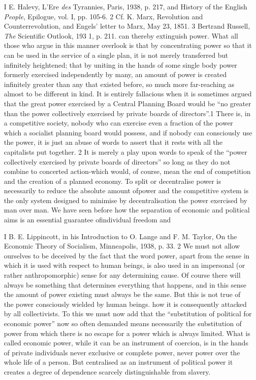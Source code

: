 \documentclass[11pt,openany]{book}
\begin{document}
I E. Halevy, L'Ere \emph{des} Tyrannies, Paris, 1938, p. 217, and History of the English \emph{People}, Epilogue, vol. I, pp. 105-6. 2 Cf. K. Marx, Revolution and Counterrevolution, and Engels' letter to Marx, May 23, 1851. 3 Bertrand Russell, \emph{The} Scientific Outlook, 193 1, p. 211. can thereby extinguish power. What all those who argue in this manner overlook is that by concentrating power so that it can be used in the service of a single plan, it is not merely transferred but infinitely heightened; that by uniting in the hands of some single body power formerly exercised independently by many, an amount of power is created infinitely greater than any that existed before, so much more far-reaching as almost to be different in kind. It is entirely fallacious when it is sometimes argued that the great power exercised by a Central Planning Board would be ``no greater than the power collectively exercised by private boards of directors''.1 There is, in a competitive society, nobody who can exercise even a fraction of the power which a socialist planning board would possess, and if nobody can consciously use the power, it is just an abuse of words to assert that it rests with all the capitalists put together. 2 It is merely a play upon words to speak of the ``power collectively exercised by private boards of directors'' so long as they do not combine to concerted action-which would, of course, mean the end of competition and the creation of a planned economy. To split or decentralise power is necessarily to reduce the absolute amount ofpower and the competitive system is the only system designed to minimise by decentralisation the power exercised by man over man. We have seen before how the separation of economic and political aims is an essential guarantee ofindividual freedom and

I B. E. Lippincott, in his Introduction to O. Lange and F. M. Taylor, On the Economic Theory of Socialism, Minneapolis, 1938, p. 33. 2 We must not allow ourselves to be deceived by the fact that the word power, apart from the sense in which it is used with respect to human beings, is also used in an impersonal (or rather anthropomorphic) sense for any determining cause. Of course there will always be something that determines everything that happens, and in this sense the amount of power existing must always be the same. But this is not true of the power consciously wielded by human beings. how it is consequently attacked by all collectivists. To this we must now add that the ``substitution of political for economic power'' now so often demanded means necessarily the substitution of power from which there is no escape for a power which is always limited. What is called economic power, while it can be an instrument of coercion, is in the hands of private individuals never exclusive or complete power, never power over the whole life of a person. But centralised as an instrument of political power it creates a degree of dependence scarcely distinguishable from slavery.
\end{document}
